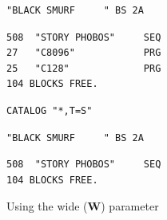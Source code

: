 \begin{description}[leftmargin=2cm,style=nextline]
\begin{tcolorbox}[colback=black,coltext=white]
\selectfont{\codefont 0}
\begin{tcolorbox}[colback=white,coltext=black,arc=0mm,boxrule=0mm,
       left*=0.5mm,right*=0mm,top=0mm,bottom=0mm,nobeforeafter,
       left skip=0.5mm,
       width=28mm,height=3mm,valign=center]
\begin{verbatim}
"BLACK SMURF     " BS 2A
\end{verbatim}
\end{tcolorbox}
\begin{verbatim}
508  "STORY PHOBOS"     SEQ
27   "C8096"            PRG
25   "C128"             PRG
104 BLOCKS FREE.
\end{verbatim}
\end{tcolorbox}

\begin{tcolorbox}[colback=black,coltext=white]
\verbatimfont{\codefont}
\begin{verbatim}
CATALOG "*,T=S"
\end{verbatim}

\selectfont{\codefont 0}
\begin{tcolorbox}[colback=white,coltext=black,arc=0mm,boxrule=0mm,
       left*=0.5mm,right*=0mm,top=0mm,bottom=0mm,nobeforeafter,
       left skip=0.5mm,
       width=28mm,height=3mm,valign=center]
\begin{verbatim}
"BLACK SMURF     " BS 2A
\end{verbatim}
\end{tcolorbox}
\begin{verbatim}
508  "STORY PHOBOS"     SEQ
104 BLOCKS FREE.
\end{verbatim}
\end{tcolorbox}

                  Using the wide ({\bf W}) parameter

\label{3columndirlisting}


\end{description}
